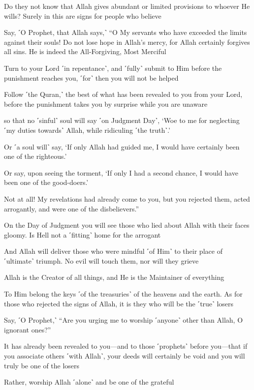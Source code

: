 Do they not know that Allah gives abundant or limited provisions to whoever He wills? Surely in this are signs for people who believe

Say, ˹O Prophet, that Allah says,˺ “O My servants who have exceeded the limits against their souls! Do not lose hope in Allah’s mercy, for Allah certainly forgives all sins. He is indeed the All-Forgiving, Most Merciful

Turn to your Lord ˹in repentance˺, and ˹fully˺ submit to Him before the punishment reaches you, ˹for˺ then you will not be helped

Follow ˹the Quran,˺ the best of what has been revealed to you from your Lord, before the punishment takes you by surprise while you are unaware

so that no ˹sinful˺ soul will say ˹on Judgment Day˺, ‘Woe to me for neglecting ˹my duties towards˺ Allah, while ridiculing ˹the truth˺.’

Or ˹a soul will˺ say, ‘If only Allah had guided me, I would have certainly been one of the righteous.’

Or say, upon seeing the torment, ‘If only I had a second chance, I would have been one of the good-doers.’

Not at all! My revelations had already come to you, but you rejected them, acted arrogantly, and were one of the disbelievers.”

On the Day of Judgment you will see those who lied about Allah with their faces gloomy. Is Hell not a ˹fitting˺ home for the arrogant

And Allah will deliver those who were mindful ˹of Him˺ to their place of ˹ultimate˺ triumph. No evil will touch them, nor will they grieve

Allah is the Creator of all things, and He is the Maintainer of everything

To Him belong the keys ˹of the treasuries˺ of the heavens and the earth. As for those who rejected the signs of Allah, it is they who will be the ˹true˺ losers

Say, ˹O Prophet,˺ “Are you urging me to worship ˹anyone˺ other than Allah, O ignorant ones?”

It has already been revealed to you—and to those ˹prophets˺ before you—that if you associate others ˹with Allah˺, your deeds will certainly be void and you will truly be one of the losers

Rather, worship Allah ˹alone˺ and be one of the grateful

